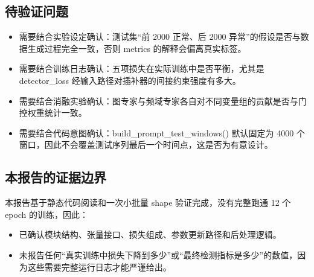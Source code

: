 \documentclass[11pt,a4paper]{ctexart}
\newcommand{\code}[1]{{\ttfamily\small #1}}
\begin{document}
\subsection{待验证问题}

\begin{itemize}
  \item 需要结合实验设定确认：测试集“前 2000 正常、后 2000 异常”的假设是否与数据生成过程完全一致，否则 \code{metrics} 的解释会偏离真实标签。
  \item 需要结合训练日志确认：五项损失在实际训练中是否平衡，尤其是 \code{detector\_loss} 经输入路径对插补器的间接约束强度有多大。
  \item 需要结合消融实验确认：图专家与频域专家各自对不同变量组的贡献是否与门控权重统计一致。
  \item 需要结合代码意图确认：\code{build\_prompt\_test\_windows()} 默认固定为 4000 个窗口，因此不会覆盖测试序列最后一个时间点，这是否为有意设计。
\end{itemize}

\subsection{本报告的证据边界}

本报告基于静态代码阅读和一次小批量 shape 验证完成，没有完整跑通 12 个 epoch 的训练，因此：
\begin{itemize}
  \item 已确认模块结构、张量接口、损失组成、参数更新路径和后处理逻辑。
  \item 未报告任何“真实训练中损失下降到多少”或“最终检测指标是多少”的数值，因为这些需要完整运行日志才能严谨给出。
\end{itemize}
\end{document}
